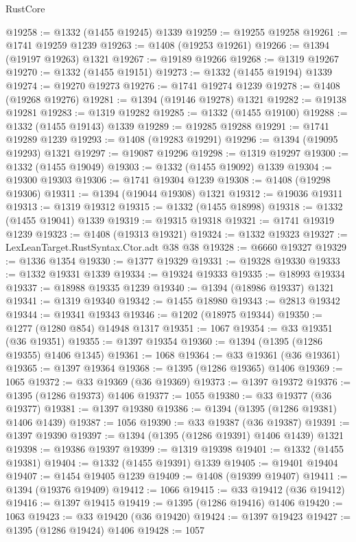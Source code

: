 \begin{lexlean}{RustCore}
\begin{coremodule}
@19258 := @1332 (@1455 @19245) @1339
@19259 := @19255 @19258
@19261 := @1741 @19259 @1239
@19263 := @1408 (@19253 @19261)
@19266 := @1394 (@19197 @19263) @1321
@19267 := @19189 @19266
@19268 := @1319 @19267
@19270 := @1332 (@1455 @19151)
@19273 := @1332 (@1455 @19194) @1339
@19274 := @19270 @19273
@19276 := @1741 @19274 @1239
@19278 := @1408 (@19268 @19276)
@19281 := @1394 (@19146 @19278) @1321
@19282 := @19138 @19281
@19283 := @1319 @19282
@19285 := @1332 (@1455 @19100)
@19288 := @1332 (@1455 @19143) @1339
@19289 := @19285 @19288
@19291 := @1741 @19289 @1239
@19293 := @1408 (@19283 @19291)
@19296 := @1394 (@19095 @19293) @1321
@19297 := @19087 @19296
@19298 := @1319 @19297
@19300 := @1332 (@1455 @19049)
@19303 := @1332 (@1455 @19092) @1339
@19304 := @19300 @19303
@19306 := @1741 @19304 @1239
@19308 := @1408 (@19298 @19306)
@19311 := @1394 (@19044 @19308) @1321
@19312 := @19036 @19311
@19313 := @1319 @19312
@19315 := @1332 (@1455 @18998)
@19318 := @1332 (@1455 @19041) @1339
@19319 := @19315 @19318
@19321 := @1741 @19319 @1239
@19323 := @1408 (@19313 @19321)
@19324 := @1332 @19323
@19327 := LexLeanTarget.RustSyntax.Ctor.adt @38 @38
@19328 := @6660 @19327
@19329 := @1336 @1354
@19330 := @1377 @19329
@19331 := @19328 @19330
@19333 := @1332 @19331 @1339
@19334 := @19324 @19333
@19335 := @18993 @19334
@19337 := @18988 @19335 @1239
@19340 := @1394 (@18986 @19337) @1321
@19341 := @1319 @19340
@19342 := @1455 @18980
@19343 := @2813 @19342
@19344 := @19341 @19343
@19346 := @1202 (@18975 @19344)
@19350 := @1277 (@1280 @854) @14948 @1317
@19351 := 1067
@19354 := @33 @19351 (@36 @19351)
@19355 := @1397 @19354
@19360 := @1394 (@1395 (@1286 @19355) @1406 @1345)
@19361 := 1068
@19364 := @33 @19361 (@36 @19361)
@19365 := @1397 @19364
@19368 := @1395 (@1286 @19365) @1406
@19369 := 1065
@19372 := @33 @19369 (@36 @19369)
@19373 := @1397 @19372
@19376 := @1395 (@1286 @19373) @1406
@19377 := 1055
@19380 := @33 @19377 (@36 @19377)
@19381 := @1397 @19380
@19386 := @1394 (@1395 (@1286 @19381) @1406 @1439)
@19387 := 1056
@19390 := @33 @19387 (@36 @19387)
@19391 := @1397 @19390
@19397 := @1394 (@1395 (@1286 @19391) @1406 @1439) @1321
@19398 := @19386 @19397
@19399 := @1319 @19398
@19401 := @1332 (@1455 @19381)
@19404 := @1332 (@1455 @19391) @1339
@19405 := @19401 @19404
@19407 := @1454 @19405 @1239
@19409 := @1408 (@19399 @19407)
@19411 := @1394 (@19376 @19409)
@19412 := 1066
@19415 := @33 @19412 (@36 @19412)
@19416 := @1397 @19415
@19419 := @1395 (@1286 @19416) @1406
@19420 := 1063
@19423 := @33 @19420 (@36 @19420)
@19424 := @1397 @19423
@19427 := @1395 (@1286 @19424) @1406
@19428 := 1057

\end{coremodule}
\end{lexlean}
